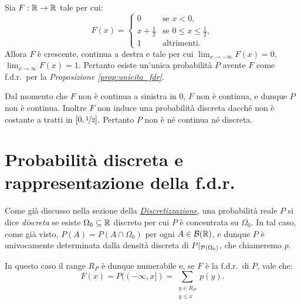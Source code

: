 \begin{multicols*}{2}
\begin{center}
\end{center}

\begin{example}
    Sia $F : \mathbb{R} \to \mathbb{R}$ tale per cui:
    \[
        F(x) = \begin{cases}
            0 & \text{se } x < 0, \\
            x + \frac{1}{2} & \text{se } 0 \leq x \leq \frac{1}{2}, \\
            1 & \text{altrimenti}.
        \end{cases}
    \]
    Allora $F$ è crescente, continua a destra e tale per cui
    $\lim_{x \to -\infty} F(x) = 0$, $\lim_{x \to \infty} F(x) = 1$.
    Pertanto esiste un'unica probabilità $P$ avente $F$ come f.d.r.~per la
    \textit{Proposizione \ref{prop:unicita_fdr}}. \smallskip


    Dal momento che $F$ non è continua a sinistra in $0$, $F$ non è continua, e dunque
    $P$ non è continua. Inoltre $F$ non induce una probabilità discreta dacché
    non è costante a tratti in $[0, \nicefrac{1}{2}]$. Pertanto $P$ non è né
    continua né discreta.
\end{example}

\section{Probabilità discreta e rappresentazione della f.d.r.}

Come già discusso nella sezione della \textit{\hyperref[sec:discretizzazione]{Discretizzazione}},
una probabilità reale $P$ si dice \textit{discreta} se esiste $\Omega_0 \subseteq \mathbb{R}$
discreto per cui $P$ è concentrata su $\Omega_0$. In tal caso, come già visto,
$P(A) = P(A \cap \Omega_0)$ per ogni $A \in \mathcal{B}(\mathbb{R})$, e dunque $P$ è univocamente determinata
dalla densità discreta di $P\arrowvert_{\mathcal{P}(\Omega_0)}$, che chiameremo $p$. \smallskip


In questo caso il range $R_P$ è dunque numerabile e, se $F$ è la f.d.r.~di $P$, vale che:
\[
    F(x) = P((-\infty, x]) = \sum_{\substack{y \in R_P \\ y \leq x}} p(y).
\]


\end{multicols*}
